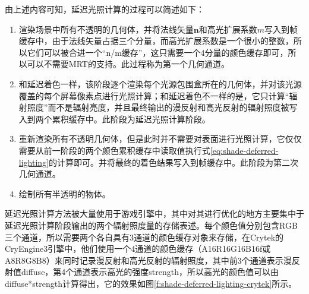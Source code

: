 由上述内容可知，延迟光照计算的过程可以简述如下：

\begin{enumerate}
	\item 渲染场景中所有不透明的几何体，并将法线矢量$\mathbf{n}$和高光扩展系数$m$写入到帧缓存中，由于法线矢量占据三个分量，而高光扩展系数是一个很小的整数，所以它们可以被合进一个“n/m缓存”，这只需要一个4分量的颜色缓存即可，所以可以不需要MRT的支持。此过程称为第一个几何通道。
	\item 和延迟着色一样，该阶段逐个渲染每个光源包围盒所在的几何体，并对该光源覆盖的每个屏幕像素点进行光照计算；和延迟着色不一样的是，它只计算“辐射照度”而不是辐射亮度，并且最终输出的漫反射和高光反射的辐射照度被写入到两个累积缓存中。此阶段为延迟光照计算阶段。
	\item 重新渲染所有不透明几何体，但是此时并不需要对表面进行光照计算，它仅仅需要从前一阶段的两个颜色累积缓存中读取值执行式\ref{eq:shade-deferred-lighting}的计算即可。并将最终的着色结果写入到帧缓存中。此阶段为第二次几何通道。
	\item 绘制所有半透明的物体。
\end{enumerate}

延迟光照计算方法被大量使用于游戏引擎中，其中对其进行优化的地方主要集中于延迟光照计算阶段输出的两个辐射照度量的存储表述。每个颜色值分别包含RGB三个通道，所以需要两个各自具有3通道的颜色缓存对象来存储，在Crytek的CryEngine3\cite{a:AbitmoreDeferred-CryEngine3}引擎中，他们使用一个4通道的颜色缓存（A16R16G16B16f或A8R8G8B8）来同时记录漫反射和高光反射的辐射照度，其中前3个通道表示漫反射值diffuse，第4个通道表示高光的强度strength，所以高光的颜色值可以由diffuse*strength计算得出，它的效果如图\ref{f:shade-deferred-lighting-crytek}所示。

